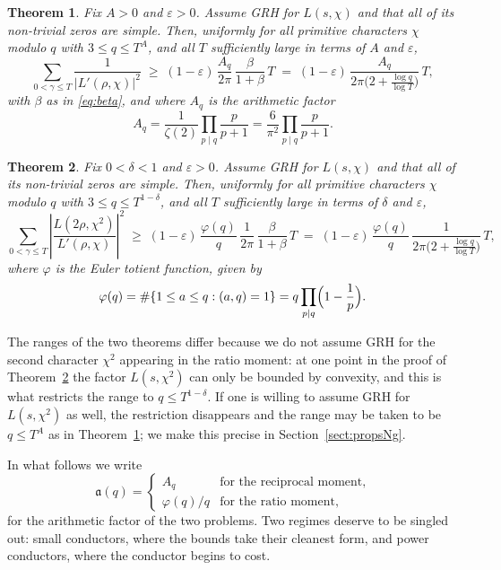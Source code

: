 \documentclass[12pt,a4paper,reqno]{amsart}
\newtheorem{theorem}{Theorem}
\theoremstyle{remark}
\numberwithin{equation}{section}
\begin{document}
\begin{theorem}\label{thm:MN}
Fix $A>0$ and $\varepsilon>0$. Assume GRH for $L(s,\chi)$ and that all of its non-trivial zeros are simple. Then, uniformly for all primitive characters $\chi$ modulo $q$ with $3\le q\le T^{A}$, and all $T$ sufficiently large in terms of $A$ and $\varepsilon$,
\[
\sum_{0<\gamma\le T}\frac{1}{|L'(\rho,\chi)|^2}
\;\ge\;(1-\varepsilon)\,\frac{A_q}{2\pi}\,\frac{\beta}{1+\beta}\,T
\;=\;(1-\varepsilon)\,\frac{A_q}{2\pi\bigl(2+\frac{\log q}{\log T}\bigr)}\,T ,
\]
with $\beta$ as in \eqref{eq:beta}, and where $A_q$ is the arithmetic factor
\begin{equation}\label{eq:Aq}
A_q=\frac{1}{\zeta(2)}\prod_{p\mid q}\frac{p}{p+1}=\frac{6}{\pi^2}\prod_{p\mid q}\frac{p}{p+1}.
\end{equation}
\end{theorem}

\begin{theorem}\label{thm:Ng}
Fix $0<\delta<1$ and $\varepsilon>0$. Assume GRH for $L(s,\chi)$ and that all of its non-trivial zeros are simple. Then, uniformly for all primitive characters $\chi$ modulo $q$ with $3\le q\le T^{1-\delta}$, and all $T$ sufficiently large in terms of $\delta$ and $\varepsilon$,
\[
\sum_{0<\gamma\le T}\left|\frac{L(2\rho,\chi^2)}{L'(\rho,\chi)}\right|^2
\;\ge\;(1-\varepsilon)\,\frac{\varphi(q)}{q}\,\frac{1}{2\pi}\,\frac{\beta}{1+\beta}\,T
\;=\;(1-\varepsilon)\,\frac{\varphi(q)}{q}\,\frac{1}{2\pi\bigl(2+\frac{\log q}{\log T}\bigr)}\,T,
\]
where $\varphi$ is the Euler totient function, given by
\[
\varphi(q)=\#\{1\le a\le q:(a,q)=1\}=q\prod_{p\mid q}\Bigl(1-\frac1p\Bigr).
\]
\end{theorem}

The ranges of the two theorems differ because we do not assume GRH for the second character $\chi^2$ appearing in the ratio moment: at one point in the proof of Theorem~\ref{thm:Ng} the factor $L(s,\chi^2)$ can only be bounded by convexity, and this is what restricts the range to $q\le T^{1-\delta}$. If one is willing to assume GRH for $L(s,\chi^2)$ as well, the restriction disappears and the range may be taken to be $q\le T^{A}$ as in Theorem~\ref{thm:MN}; we make this precise in Section~\ref{sect:propsNg}.

In what follows we write
\begin{equation}\label{eq:aq}
\mathfrak a(q)=
\begin{cases}
A_q & \text{for the reciprocal moment},\\[2pt]
\varphi(q)/q & \text{for the ratio moment},
\end{cases}
\end{equation}
for the arithmetic factor of the two problems. Two regimes deserve to be singled out: small conductors, where the bounds take their cleanest form, and power conductors, where the conductor begins to cost.
\end{document}
